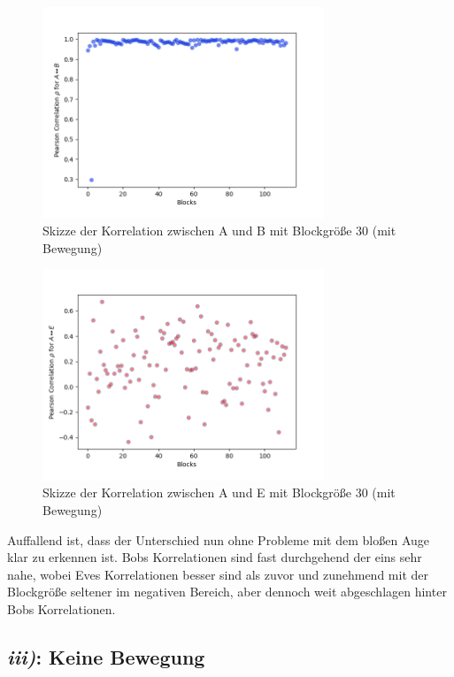 \documentclass[12pt,a4paper]{article}
\begin{document}
\begin{figure}[hbt!]
	\centering
		\includegraphics[width=0.75\textwidth ]
		{Bilder/a3-t2-block30-correlation-AB.png}
		\caption{Skizze der Korrelation zwischen A und B mit Blockgröße 30 (mit Bewegung)}
		\label{fig:Label6}
\end{figure}

\begin{figure}[hbt!]
	\centering
		\includegraphics[width=0.75\textwidth ]
		{Bilder/a3-t2-block30-correlation-AE.png}
		\caption{Skizze der Korrelation zwischen A und E mit Blockgröße 30 (mit Bewegung)}
		\label{fig:Label7}
\end{figure}



Auffallend ist, dass der Unterschied nun ohne Probleme mit dem bloßen 
Auge klar zu erkennen ist. Bobs Korrelationen sind fast durchgehend der 
eins sehr nahe, wobei Eves Korrelationen besser sind als zuvor und 
zunehmend mit der Blockgröße seltener im negativen Bereich, aber dennoch
weit abgeschlagen hinter Bobs Korrelationen.


\subsection*{\textit{iii)}: Keine Bewegung}
\end{document}
